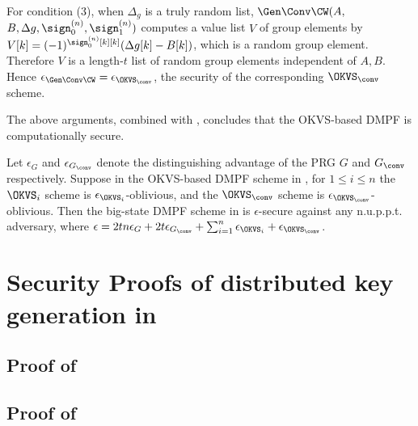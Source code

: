 For condition (3), when $\Delta_g$ is a truly random list, $\Gen\Conv\CW(A,$\linebreak$B,\Delta g,\sign_0^{(n)},\sign_1^{(n)})$ computes a value list $V$ of group elements by $V[k] = (-1)^{\sign_0^{(n)}[k][k]}(\Delta g[k] - B[k])$, which is a random group element. Therefore $V$ is a length-$t$ list of random group elements independent of $A,B$. Hence $\epsilon_{\Gen\Conv\CW} = \epsilon_{\OKVS_\conv}$, the security of the corresponding $\OKVS_\conv$ scheme. 

The above arguments, combined with , concludes that the OKVS-based DMPF is computationally secure. 

\begin{theorem}\label{thm:OKVS_DMPF_secure}
    Let $\epsilon_G$ and $\epsilon_{G_\conv}$ denote the distinguishing advantage of the PRG $G$ and $G_\conv$ respectively. Suppose in the OKVS-based DMPF scheme in , for $1\le i\le n$ the $\OKVS_i$ scheme is $\epsilon_{\OKVS_i}$-oblivious, and the $\OKVS_{\conv}$ scheme is $\epsilon_{\OKVS_\conv}$-oblivious. Then the big-state DMPF scheme in  is $\epsilon$-secure against any n.u.p.p.t. adversary, where $\epsilon = 2tn\epsilon_G+2t\epsilon_{G_\conv} +\sum_{i=1}^n\epsilon_{\OKVS_i}+\epsilon_{\OKVS_\conv}$. 
\end{theorem}

\section{Security Proofs of distributed key generation in~}\label{sec:security-proof-distrgen}
\subsection{Proof of~}\label{sec:shared-ipd-security}
\subsection{Proof of~}\label{sec:big-state-DKG-security}